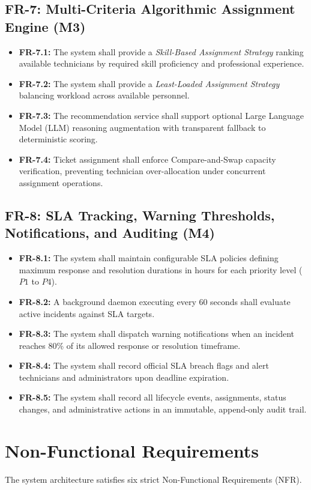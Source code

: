 \documentclass[11pt,a4paper,oneside]{report}
\begin{document}
\subsection{FR-7: Multi-Criteria Algorithmic Assignment Engine (M3)}
\begin{itemize}
    \item \textbf{FR-7.1:} The system shall provide a \textit{Skill-Based Assignment Strategy} ranking available technicians by required skill proficiency and professional experience.
    \item \textbf{FR-7.2:} The system shall provide a \textit{Least-Loaded Assignment Strategy} balancing workload across available personnel.
    \item \textbf{FR-7.3:} The recommendation service shall support optional Large Language Model (LLM) reasoning augmentation with transparent fallback to deterministic scoring.
    \item \textbf{FR-7.4:} Ticket assignment shall enforce Compare-and-Swap capacity verification, preventing technician over-allocation under concurrent assignment operations.
\end{itemize}

\subsection{FR-8: SLA Tracking, Warning Thresholds, Notifications, and Auditing (M4)}
\begin{itemize}
    \item \textbf{FR-8.1:} The system shall maintain configurable SLA policies defining maximum response and resolution durations in hours for each priority level ($P1$ to $P4$).
    \item \textbf{FR-8.2:} A background daemon executing every 60 seconds shall evaluate active incidents against SLA targets.
    \item \textbf{FR-8.3:} The system shall dispatch warning notifications when an incident reaches 80\% of its allowed response or resolution timeframe.
    \item \textbf{FR-8.4:} The system shall record official SLA breach flags and alert technicians and administrators upon deadline expiration.
    \item \textbf{FR-8.5:} The system shall record all lifecycle events, assignments, status changes, and administrative actions in an immutable, append-only audit trail.
\end{itemize}

\section{Non-Functional Requirements}
\label{sec:req_non_functional}
The system architecture satisfies six strict Non-Functional Requirements (NFR).
\end{document}
